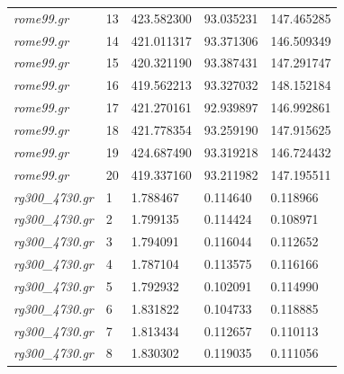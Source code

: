 \documentclass[12pt]{article}
\begin{document}
\begin{longtable}{l|l|lll}
\textit{rome99.gr}               &  13       & 423.582300             & 93.035231            & 147.465285                   \\
\textit{rome99.gr}               &  14       & 421.011317             & 93.371306            & 146.509349                   \\
\textit{rome99.gr}               &  15       & 420.321190             & 93.387431            & 147.291747                   \\
\textit{rome99.gr}               &  16       & 419.562213             & 93.327032            & 148.152184                   \\
\textit{rome99.gr}               &  17       & 421.270161             & 92.939897            & 146.992861                   \\
\textit{rome99.gr}               &  18       & 421.778354             & 93.259190            & 147.915625                   \\
\textit{rome99.gr}               &  19       & 424.687490             & 93.319218            & 146.724432                   \\
\textit{rome99.gr}               &  20       & 419.337160             & 93.211982            & 147.195511                   \\ \hline
\textit{rg300\_4730.gr}          &  1        & 1.788467               & 0.114640             & 0.118966                     \\
\textit{rg300\_4730.gr}          &  2        & 1.799135               & 0.114424             & 0.108971                     \\
\textit{rg300\_4730.gr}          &  3        & 1.794091               & 0.116044             & 0.112652                     \\
\textit{rg300\_4730.gr}          &  4        & 1.787104               & 0.113575             & 0.116166                     \\
\textit{rg300\_4730.gr}          &  5        & 1.792932               & 0.102091             & 0.114990                     \\
\textit{rg300\_4730.gr}          &  6        & 1.831822               & 0.104733             & 0.118885                     \\
\textit{rg300\_4730.gr}          &  7        & 1.813434               & 0.112657             & 0.110113                     \\
\textit{rg300\_4730.gr}          &  8        & 1.830302               & 0.119035             & 0.111056                     \\

\end{longtable}
\end{document}
